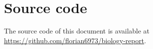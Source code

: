 \documentclass{article}
\begin{document}

    \newpage

    \appendix

    \section {Source code}
    The source code of this document is available at \url{https://github.com/florian6973/biology-report}.
    
    \nocite{*}
    \printbibliography
    
\end{document}
